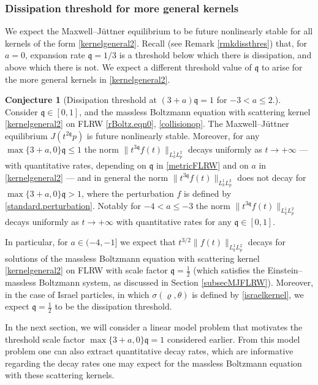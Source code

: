 \documentclass[reqno]{amsart}
\newcommand{\qq}{\mathfrak{q}}
\theoremstyle{definition}
\newtheorem{conjecture}[theorem]{Conjecture}
\numberwithin{equation}{section}
\numberwithin{theorem}{section}
\begin{document}
\subsubsection{Dissipation threshold for more general kernels}

We expect the Maxwell--J\"uttner equilibrium to be future nonlinearly stable for all kernels of the form \eqref{kernelgeneral2}. Recall (see Remark \ref{rmkdissthres}) that, for \(a=0\), expansion rate \(\qq=1/3\) is a threshold below which there is dissipation, and above which there is not. We expect a different threshold value of \(\qq\) to arise for the more general kernels in \eqref{kernelgeneral2}.




\begin{conjecture}[Dissipation threshold at \((3+a)\qq=1\) for \(-3<a\leq 2\).]
    Consider \(\qq\in [0,1]\), and the massless Boltzmann equation with scattering kernel \eqref{kernelgeneral2} on FLRW \eqref{rBoltz.eqn0}, \eqref{collisionop}. The Maxwell--J\"uttner equilibrium \(J(t^{2\qq}p)\) is future nonlinearly stable. Moreover, for any \(\max\{3+a, 0\}\qq\leq 1\) the norm \(\|t^{3\qq}f(t)\|_{L^{1}_kL^2_p}\) decays uniformly as \(t\to +\infty\) --- with quantitative rates, depending on \(\qq\) in \eqref{metricFLRW} and on \(a\) in \eqref{kernelgeneral2} --- and in general the norm $\|t^{3\qq}f(t)\|_{L^{1}_kL^2_p}$ does not decay for \(\max\{3+a, 0\}\qq>1\), where the perturbation \(f\) is defined by \eqref{standard.perturbation}.  Notably for \(-4<a\leq -3\) the norm \(\|t^{3\qq}f(t)\|_{L^{1}_kL^2_p}\) decays uniformly as \(t\to +\infty\) with quantitative rates for any \(\qq\in [0,1].\)
\end{conjecture}



In particular, for \(a\in (-4,-1]\) we expect that \(t^{3/2}\|f(t)\|_{L^1_{k}L^2_{p}}\) decays for solutions of the massless Boltzmann equation with scattering kernel \eqref{kernelgeneral2} on FLRW with scale factor \(\qq=\frac{1}{2}\) (which satisfies the Einstein--massless Boltzmann system, as discussed in Section \ref{subsecMJFLRW}). Moreover, in the case of Israel particles, in which \(\sigma(\varrho,\theta)\) is defined by \eqref{israelkernel}, we expect \(\qq=\frac{1}{2}\) to be the dissipation threshold.


In the next section, we will consider a linear model problem that motivates the threshold scale factor \(\max\{ 3+a, 0\}\qq=1\) considered earlier. From this model problem one can also extract quantitative decay rates, which are informative regarding the decay rates one may expect for the massless Boltzmann equation with these scattering kernels.
\end{document}
